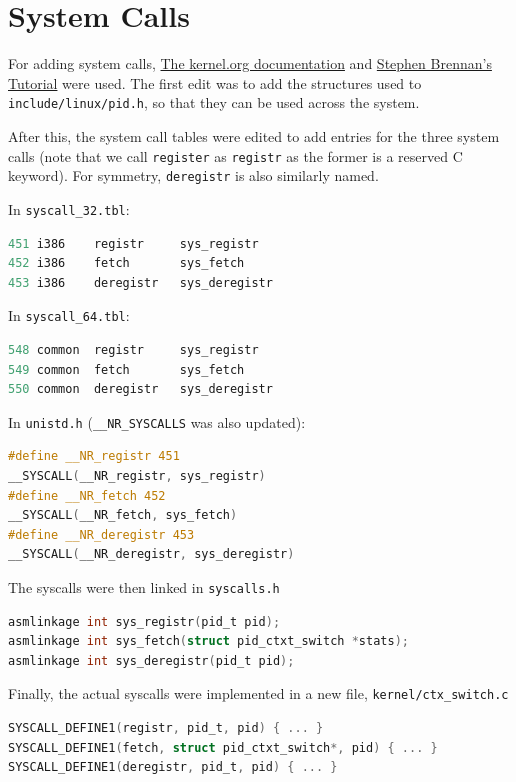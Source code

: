 \documentclass[12pt]{article}
\begin{document}
\pagebreak 

\section{System Calls}

For adding system calls, 
\href{https://www.kernel.org/doc/html/v4.12/process/adding-syscalls.html}
{The kernel.org documentation} and
\href{https://brennan.io/2016/11/14/kernel-dev-ep3/}{Stephen Brennan's Tutorial}
were used. The first edit was to add the structures used to \texttt{include/linux/pid.h},
so that they can be used across the system.

After this, the system call tables were edited to add entries for the three
system calls (note that we call \texttt{register} as \texttt{registr} as the 
former is a reserved C keyword). For symmetry, \texttt{deregistr} is also
similarly named.

In \texttt{syscall\_32.tbl}:
\begin{lstlisting}[language=C]
451	i386	registr		sys_registr
452	i386	fetch		sys_fetch
453	i386	deregistr	sys_deregistr 
\end{lstlisting}

In \texttt{syscall\_64.tbl}:
\begin{lstlisting}[language=C]
548	common	registr		sys_registr
549	common	fetch		sys_fetch
550	common	deregistr	sys_deregistr 
\end{lstlisting}

In \texttt{unistd.h} (\texttt{\_\_NR\_SYSCALLS} was also updated):
\begin{lstlisting}[language=C]
#define __NR_registr 451
__SYSCALL(__NR_registr, sys_registr)
#define __NR_fetch 452
__SYSCALL(__NR_fetch, sys_fetch)
#define __NR_deregistr 453
__SYSCALL(__NR_deregistr, sys_deregistr)
\end{lstlisting}

The syscalls were then linked in \texttt{syscalls.h}
\begin{lstlisting}[language=C]
asmlinkage int sys_registr(pid_t pid);
asmlinkage int sys_fetch(struct pid_ctxt_switch *stats);
asmlinkage int sys_deregistr(pid_t pid);
\end{lstlisting}

Finally, the actual syscalls were implemented in a new file, 
\texttt{kernel/ctx\_switch.c}

\begin{lstlisting}[language=C]
SYSCALL_DEFINE1(registr, pid_t, pid) { ... }
SYSCALL_DEFINE1(fetch, struct pid_ctxt_switch*, pid) { ... }
SYSCALL_DEFINE1(deregistr, pid_t, pid) { ... }
\end{lstlisting}
\end{document}
